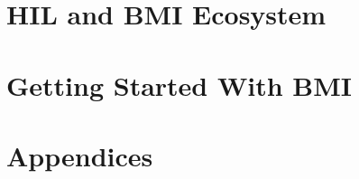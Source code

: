 \documentclass[letter, 11pt, twoside, openright, english]{memoir}
\begin{document}
\frontmatter

%


\mainmatter
%
\part{HIL and BMI Ecosystem}

\part{Getting Started With BMI}

%
%

\appendix
\part{Appendices}

\backmatter


\printindex
\end{document}

